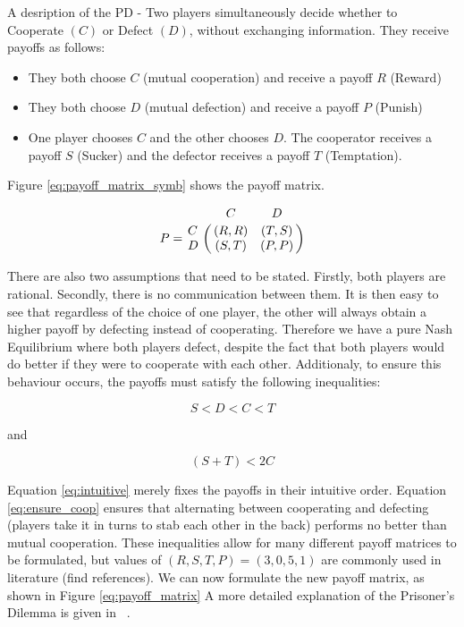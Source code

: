 A desription of the PD - Two players simultaneously decide whether to Cooperate $(C)$ or Defect $(D)$, without exchanging information.
They receive payoffs as follows:

\begin{itemize}
\item They both choose $C$ (mutual cooperation) and receive a payoff $R$ (Reward)
\item They both choose $D$ (mutual defection) and receive a payoff $P$ (Punish)
\item One player chooses $C$ and the other chooses $D$. The cooperator receives a payoff $S$ (Sucker) and the defector receives a payoff $T$ (Temptation).
\end{itemize}

Figure \ref{eq:payoff_matrix_symb} shows the payoff matrix.

\begin{equation}\label{eq:payoff_matrix_symb}
% 
P = \bordermatrix{~ & C & D \cr
                  C & (R, R) & (T, S) \cr
                  D & (S, T) & (P, P) \cr}
% 
\end{equation}

There are also two assumptions that need to be stated.
Firstly, both players are rational.
Secondly, there is no communication between them.
It is then easy to see that regardless of the choice of one player, the other will always obtain a higher payoff by defecting instead of cooperating.
Therefore we have a pure Nash Equilibrium where both players defect, despite the fact that both players would do better if they were to cooperate with each other.
Additionaly, to ensure this behaviour occurs, the payoffs must satisfy the following inequalities:

\begin{equation}\label{eq:intuitive}
S < D < C < T
\end{equation}

and

\begin{equation}\label{eq:ensure_coop}
(S + T) < 2 C
\end{equation}

Equation \ref{eq:intuitive} merely fixes the payoffs in their intuitive order.
Equation \ref{eq:ensure_coop} ensures that alternating between cooperating and defecting (players take it in turns to stab each other in the back) performs no better than mutual cooperation.
These inequalities allow for many different payoff matrices to be formulated, but values of $(R, S, T, P) = (3, 0, 5, 1)$ are commonly used in literature (find references).
We can now formulate the new payoff matrix, as shown in Figure \ref{eq:payoff_matrix}
A more detailed explanation of the Prisoner's Dilemma is given in ~\cite{Gotts2003}.

